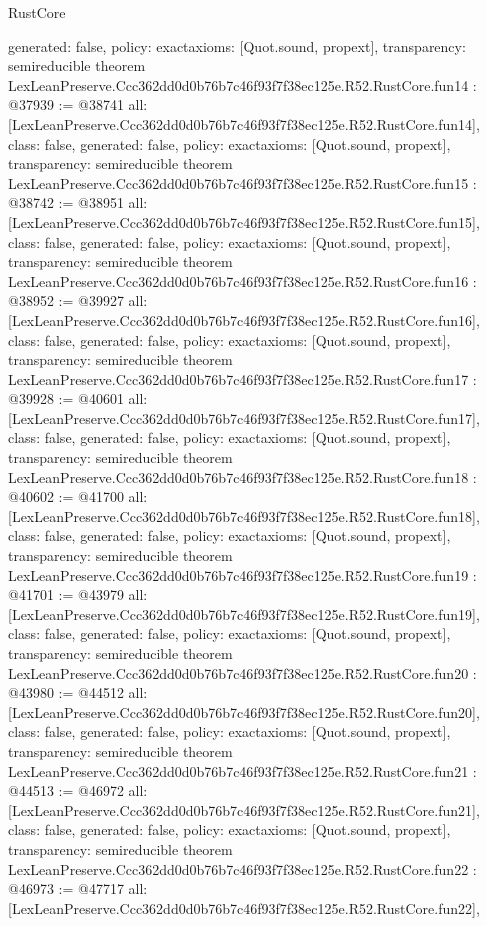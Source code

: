 \begin{lexlean}{RustCore}
\begin{coremodule}
{  generated: false,
  policy: exact{axioms: [Quot.sound, propext]},
  transparency: semireducible
}
theorem LexLeanPreserve.Ccc362dd0d0b76b7c46f93f7f38ec125e.R52.RustCore.fun14 : @37939 := @38741 {
  all: [LexLeanPreserve.Ccc362dd0d0b76b7c46f93f7f38ec125e.R52.RustCore.fun14],
  class: false,
  generated: false,
  policy: exact{axioms: [Quot.sound, propext]},
  transparency: semireducible
}
theorem LexLeanPreserve.Ccc362dd0d0b76b7c46f93f7f38ec125e.R52.RustCore.fun15 : @38742 := @38951 {
  all: [LexLeanPreserve.Ccc362dd0d0b76b7c46f93f7f38ec125e.R52.RustCore.fun15],
  class: false,
  generated: false,
  policy: exact{axioms: [Quot.sound, propext]},
  transparency: semireducible
}
theorem LexLeanPreserve.Ccc362dd0d0b76b7c46f93f7f38ec125e.R52.RustCore.fun16 : @38952 := @39927 {
  all: [LexLeanPreserve.Ccc362dd0d0b76b7c46f93f7f38ec125e.R52.RustCore.fun16],
  class: false,
  generated: false,
  policy: exact{axioms: [Quot.sound, propext]},
  transparency: semireducible
}
theorem LexLeanPreserve.Ccc362dd0d0b76b7c46f93f7f38ec125e.R52.RustCore.fun17 : @39928 := @40601 {
  all: [LexLeanPreserve.Ccc362dd0d0b76b7c46f93f7f38ec125e.R52.RustCore.fun17],
  class: false,
  generated: false,
  policy: exact{axioms: [Quot.sound, propext]},
  transparency: semireducible
}
theorem LexLeanPreserve.Ccc362dd0d0b76b7c46f93f7f38ec125e.R52.RustCore.fun18 : @40602 := @41700 {
  all: [LexLeanPreserve.Ccc362dd0d0b76b7c46f93f7f38ec125e.R52.RustCore.fun18],
  class: false,
  generated: false,
  policy: exact{axioms: [Quot.sound, propext]},
  transparency: semireducible
}
theorem LexLeanPreserve.Ccc362dd0d0b76b7c46f93f7f38ec125e.R52.RustCore.fun19 : @41701 := @43979 {
  all: [LexLeanPreserve.Ccc362dd0d0b76b7c46f93f7f38ec125e.R52.RustCore.fun19],
  class: false,
  generated: false,
  policy: exact{axioms: [Quot.sound, propext]},
  transparency: semireducible
}
theorem LexLeanPreserve.Ccc362dd0d0b76b7c46f93f7f38ec125e.R52.RustCore.fun20 : @43980 := @44512 {
  all: [LexLeanPreserve.Ccc362dd0d0b76b7c46f93f7f38ec125e.R52.RustCore.fun20],
  class: false,
  generated: false,
  policy: exact{axioms: [Quot.sound, propext]},
  transparency: semireducible
}
theorem LexLeanPreserve.Ccc362dd0d0b76b7c46f93f7f38ec125e.R52.RustCore.fun21 : @44513 := @46972 {
  all: [LexLeanPreserve.Ccc362dd0d0b76b7c46f93f7f38ec125e.R52.RustCore.fun21],
  class: false,
  generated: false,
  policy: exact{axioms: [Quot.sound, propext]},
  transparency: semireducible
}
theorem LexLeanPreserve.Ccc362dd0d0b76b7c46f93f7f38ec125e.R52.RustCore.fun22 : @46973 := @47717 {
  all: [LexLeanPreserve.Ccc362dd0d0b76b7c46f93f7f38ec125e.R52.RustCore.fun22],
}
\end{coremodule}
\end{lexlean}
